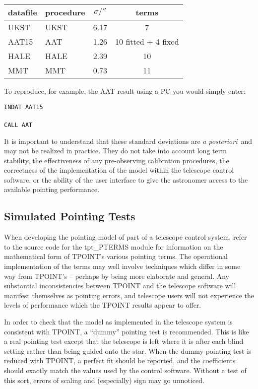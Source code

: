 \vspace{2ex}
\hspace{4.2em}
\begin{tabular}{|l|l|c|c|} \hline
datafile & procedure & $\sigma/''$ & terms \\ \hline
UKST & UKST & 6.17 &  7 \\
AAT15 & AAT  & 1.26 & 10 fitted + 4 fixed \\
HALE & HALE & 2.39 & 10 \\
MMT & MMT  & 0.73 & 11 \\ \hline
\end{tabular}
\vspace{2ex}

To reproduce, for example, the AAT result using a PC you would simply enter:
\begin{cmnds}
\> \> {\tt INDAT AAT15} \\ \\
\> \> {\tt CALL AAT}
\end{cmnds}

It is important to understand that these standard deviations are
{\it a posteriori}\, and may
not be realized in practice.  They do not take into account long
term stability, the effectiveness of any pre-observing calibration
procedures, the correctness of the implementation of the model
within the telescope control software, or the ability of the
user interface to give the astronomer access to the available
pointing performance.

\subsection{Simulated Pointing Tests}
When developing the pointing model of part of a telescope
control system, refer to the source code
for the tpt\_PTERMS module for information on the
mathematical form of TPOINT's
various pointing terms.  The operational implementation
of the terms may well involve techniques which differ in some way
from TPOINT's -- perhaps by being
more elaborate and general.  Any
substantial inconsistencies between TPOINT and the telescope
software will manifest themselves as pointing errors, and telescope
users will not experience the levels of performance
which the TPOINT results appear to offer.

In order to check that the model as implemented in the telescope
system is consistent with TPOINT, a ``dummy'' pointing test
is recommended.  This is like a real pointing test except that
the telescope is left where it is after each blind setting
rather than being guided onto the star.   When the dummy pointing test
is reduced with TPOINT, a perfect fit should be
reported, and the coefficients should exactly match
the values used by the control software.  Without a test of this
sort, errors of scaling and (especially) sign may go unnoticed.

